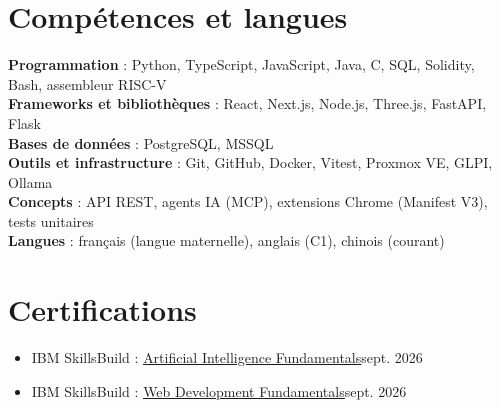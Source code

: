 \documentclass[letterpaper,11pt]{article}
\newcommand{\resumeDegreeItem}[2]{
  \item\small{#1\hfill#2\vspace{-2pt}}
}
\newcommand{\resumeItemListStart}{\begin{itemize}[labelindent=0.1in, leftmargin=*]}
\newcommand{\resumeItemListEnd}{\end{itemize}\vspace{-5pt}}
\begin{document}
\section{Compétences et langues}
 \begin{itemize}[leftmargin=0pt, label={}]
    \small{\item{
     \textbf{Programmation}{ : Python, TypeScript, JavaScript, Java, C, SQL, Solidity, Bash, assembleur RISC-V} \\
     \textbf{Frameworks et bibliothèques}{ : React, Next.js, Node.js, Three.js, FastAPI, Flask} \\
     \textbf{Bases de données}{ : PostgreSQL, MSSQL} \\
     \textbf{Outils et infrastructure}{ : Git, GitHub, Docker, Vitest, Proxmox VE, GLPI, Ollama} \\
     \textbf{Concepts}{ : API REST, agents IA (MCP), extensions Chrome (Manifest V3), tests unitaires} \\
     \textbf{Langues}{ : français (langue maternelle), anglais (C1), chinois (courant)}
    }}
 \end{itemize}


\section{Certifications}
  \resumeItemListStart
    \resumeDegreeItem{IBM SkillsBuild : \href{https://www.credly.com/badges/f42f2621-21d8-478a-9dae-b04f33677714/public_url}{\underline{Artificial Intelligence Fundamentals}}}{sept. 2026}
    \resumeDegreeItem{IBM SkillsBuild : \href{https://www.credly.com/badges/942aa2ea-c60e-4343-9da9-fcaad618f717/public_url}{\underline{Web Development Fundamentals}}}{sept. 2026}
  \resumeItemListEnd


\end{document}
